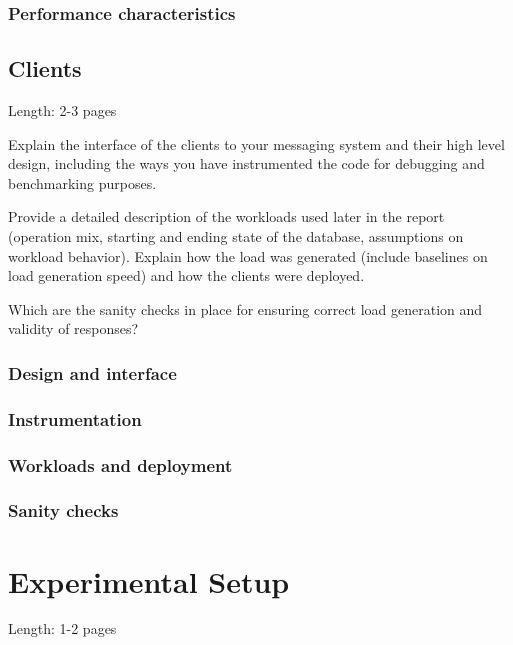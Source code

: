 \documentclass[11pt]{article}
\begin{document}
\subsubsection{Performance characteristics}\label{sec:performance-characteristics-1}

\subsection{Clients}\label{sec:clients}

Length: 2-3 pages

Explain the interface of the clients to your messaging system and their
high level design, including the ways you have instrumented the code for
debugging and benchmarking purposes.

Provide a detailed description of the workloads used later in the report
(operation mix, starting and ending state of the database, assumptions
on workload behavior). Explain how the load was generated (include
baselines on load generation speed) and how the clients were deployed.

Which are the sanity checks in place for ensuring correct load
generation and validity of responses?

\subsubsection{Design and interface}\label{sec:design-and-interface}

\subsubsection{Instrumentation}\label{sec:instrumentation}

\subsubsection{Workloads and deployment}\label{sec:workloads-and-deployment}

\subsubsection{Sanity checks}\label{sec:sanity-checks}

\section{Experimental Setup}\label{sec:experimental-setup}

Length: 1-2 pages
\end{document}
